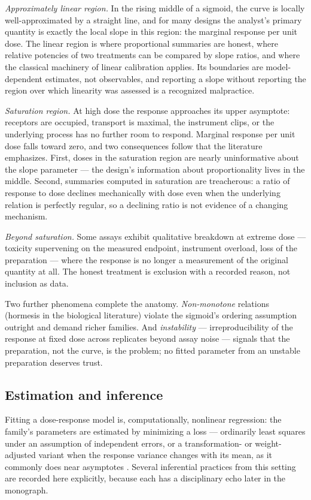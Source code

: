 \emph{Approximately linear region.} In the rising middle of a sigmoid, the curve is locally well-approximated by a straight line, and for many designs the analyst's primary quantity is exactly the local slope in this region: the marginal response per unit dose. The linear region is where proportional summaries are honest, where relative potencies of two treatments can be compared by slope ratios, and where the classical machinery of linear calibration applies. Its boundaries are model-dependent estimates, not observables, and reporting a slope without reporting the region over which linearity was assessed is a recognized malpractice.

\emph{Saturation region.} At high dose the response approaches its upper asymptote: receptors are occupied, transport is maximal, the instrument clips, or the underlying process has no further room to respond. Marginal response per unit dose falls toward zero, and two consequences follow that the literature emphasizes. First, doses in the saturation region are nearly uninformative about the slope parameter --- the design's information about proportionality lives in the middle. Second, summaries computed in saturation are treacherous: a ratio of response to dose declines mechanically with dose even when the underlying relation is perfectly regular, so a declining ratio is not evidence of a changing mechanism.

\emph{Beyond saturation.} Some assays exhibit qualitative breakdown at extreme dose --- toxicity supervening on the measured endpoint, instrument overload, loss of the preparation --- where the response is no longer a measurement of the original quantity at all. The honest treatment is exclusion with a recorded reason, not inclusion as data.

Two further phenomena complete the anatomy. \emph{Non-monotone} relations (hormesis in the biological literature) violate the sigmoid's ordering assumption outright and demand richer families. And \emph{instability} --- irreproducibility of the response at fixed dose across replicates beyond assay noise --- signals that the preparation, not the curve, is the problem; no fitted parameter from an unstable preparation deserves trust.

\subsection{Estimation and inference}\label{ch02:dose:estimation}

Fitting a dose-response model is, computationally, nonlinear regression: the family's parameters are estimated by minimizing a loss --- ordinarily least squares under an assumption of independent errors, or a transformation- or weight-adjusted variant when the response variance changes with its mean, as it commonly does near asymptotes \cite{ritz}. Several inferential practices from this setting are recorded here explicitly, because each has a disciplinary echo later in the monograph.

